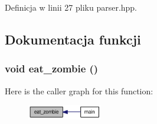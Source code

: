 Definicja w linii 27 pliku parser.hpp.

\subsection{Dokumentacja funkcji}
\hypertarget{a00015_6c724feff242ad0cd599cdd458f73199}{
\subsubsection[{eat\_\-zombie}]{\setlength{\rightskip}{0pt plus 5cm}void eat\_\-zombie ()}}
\label{dd/d1b/a00015_6c724feff242ad0cd599cdd458f73199}




Here is the caller graph for this function:\nopagebreak
\begin{figure}[H]
\begin{center}
\leavevmode
\includegraphics[width=92pt]{dd/d1b/a00015_6c724feff242ad0cd599cdd458f73199_icgraph}
\end{center}
\end{figure}

